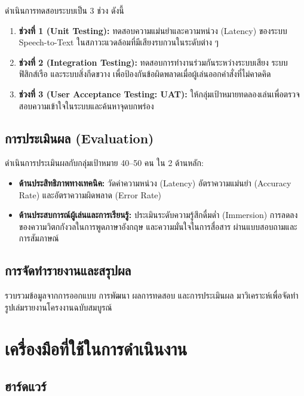 ดำเนินการทดสอบระบบเป็น 3 ช่วง ดังนี้

\begin{enumerate}[label=(\arabic*)]
    \item \textbf{ช่วงที่ 1 (Unit Testing):} ทดสอบความแม่นยำและความหน่วง (Latency) ของระบบ Speech-to-Text ในสภาวะแวดล้อมที่มีเสียงรบกวนในระดับต่าง ๆ
    \item \textbf{ช่วงที่ 2 (Integration Testing):} ทดสอบการทำงานร่วมกันระหว่างระบบเสียง ระบบฟิสิกส์เรือ และระบบสิ่งกีดขวาง เพื่อป้องกันข้อผิดพลาดเมื่อผู้เล่นออกคำสั่งที่ไม่คาดคิด
    \item \textbf{ช่วงที่ 3 (User Acceptance Testing: UAT):} ให้กลุ่มเป้าหมายทดลองเล่นเพื่อตรวจสอบความเข้าใจในระบบและค้นหาจุดบกพร่อง
\end{enumerate}

\subsection{การประเมินผล (Evaluation)}

ดำเนินการประเมินผลกับกลุ่มเป้าหมาย 40--50 คน ใน 2 ด้านหลัก:
\begin{itemize}
    \item \textbf{ด้านประสิทธิภาพทางเทคนิค:} วัดค่าความหน่วง (Latency) อัตราความแม่นยำ (Accuracy Rate) และอัตราความผิดพลาด (Error Rate)
    \item \textbf{ด้านประสบการณ์ผู้เล่นและการเรียนรู้:} ประเมินระดับความรู้สึกดื่มด่ำ (Immersion) การลดลงของความวิตกกังวลในการพูดภาษาอังกฤษ และความมั่นใจในการสื่อสาร ผ่านแบบสอบถามและการสัมภาษณ์
\end{itemize}

\subsection{การจัดทำรายงานและสรุปผล}

รวบรวมข้อมูลจากการออกแบบ การพัฒนา ผลการทดสอบ และการประเมินผล มาวิเคราะห์เพื่อจัดทำรูปเล่มรายงานโครงงานฉบับสมบูรณ์

\section{เครื่องมือที่ใช้ในการดำเนินงาน}

\subsection{ฮาร์ดแวร์}

